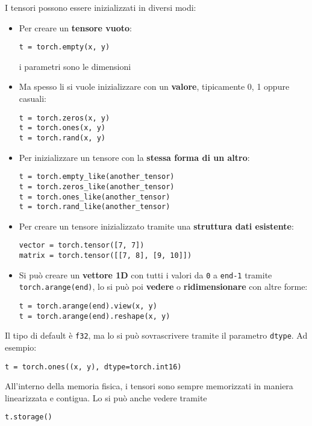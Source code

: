 I tensori possono essere inizializzati in diversi modi: 
\begin{itemize}
    \item Per creare un \textbf{tensore vuoto}:
    \begin{verbatim}
t = torch.empty(x, y)
    \end{verbatim}
    i parametri sono le dimensioni
    
    \item Ma spesso li si vuole inizializzare con un \textbf{valore}, tipicamente 0, 1 oppure casuali:
    \begin{verbatim}
t = torch.zeros(x, y)
t = torch.ones(x, y)
t = torch.rand(x, y)
    \end{verbatim}
    
    \item Per inizializzare un tensore con la \textbf{stessa forma di un altro}:
    \begin{verbatim}
t = torch.empty_like(another_tensor)
t = torch.zeros_like(another_tensor)
t = torch.ones_like(another_tensor)
t = torch.rand_like(another_tensor)
    \end{verbatim}
    
    \item Per creare un tensore inizializzato tramite una \textbf{struttura dati esistente}:
    \begin{verbatim}
vector = torch.tensor([7, 7])
matrix = torch.tensor([[7, 8], [9, 10]])
    \end{verbatim}
    
    \item Si può creare un \textbf{vettore 1D} con tutti i valori da \texttt{0} a \texttt{end-1} tramite \texttt{torch.arange(end)}, lo si può poi \textbf{vedere} o \textbf{ridimensionare} con altre forme:
    \begin{verbatim}
t = torch.arange(end).view(x, y)
t = torch.arange(end).reshape(x, y)
    \end{verbatim}
\end{itemize}

Il tipo di default è \texttt{f32}, ma lo si può sovrascrivere tramite il parametro \texttt{dtype}. Ad esempio:
\begin{verbatim}
t = torch.ones((x, y), dtype=torch.int16)
\end{verbatim}

All'interno della memoria fisica, i tensori sono sempre memorizzati in maniera linearizzata e contigua. Lo si può anche vedere tramite
\begin{verbatim}
t.storage()
\end{verbatim}

